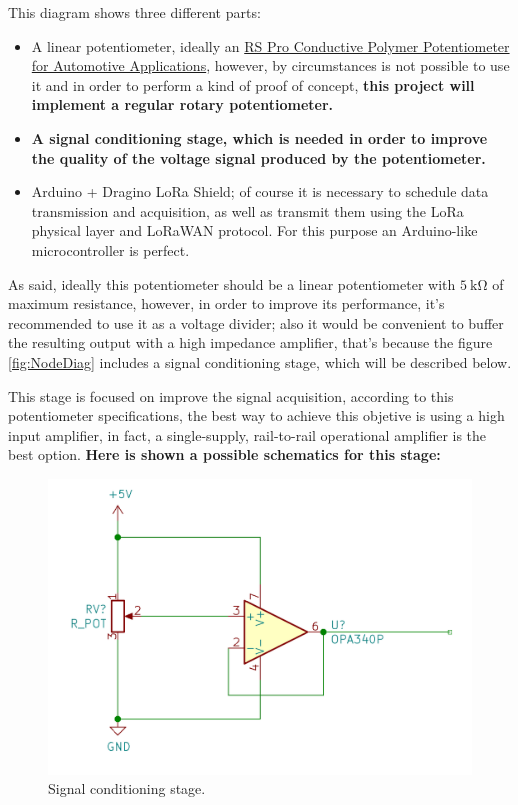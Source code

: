 \documentclass[11pt,a4paper,dvipsnames,twoside]{article}
\newcounter{subsubsubsection}[subsubsection]
\newcommand{\doubt}[1] {\textbf{\color{Red3}#1}}
\begin{document}
This diagram shows three different parts: 

\begin{itemize}
  \item A linear potentiometer, ideally an \href{https://docs.rs-online.com/37bf/0900766b814f0bd0.pdf}{RS Pro Conductive Polymer
  Potentiometer for Automotive Applications}, however, by circumstances is not possible to use it and in order to perform a kind of proof of concept, \doubt{this project will implement a regular rotary potentiometer.}
  \item \doubt{A signal conditioning stage, which is needed in order to improve the quality of the voltage signal produced by the potentiometer.}
  \item Arduino + Dragino LoRa Shield; of course it is necessary to schedule data transmission and acquisition, as well as transmit them using the LoRa physical layer and LoRaWAN protocol. For this purpose an Arduino-like microcontroller is perfect.  
\end{itemize}

As said, ideally this potentiometer should be a linear potentiometer with $5\ \si{\kilo\ohm}$ of maximum resistance, however, in order to improve its performance, it's recommended to use it as a voltage divider; also it would be convenient to buffer the resulting output with a high impedance amplifier, that's because the figure \ref{fig:NodeDiag} includes a signal conditioning stage, which will be described below.

This stage is focused on improve the signal acquisition, according to this potentiometer specifications, the best way to achieve this objetive is using a high input amplifier, in fact, a single-supply, rail-to-rail operational amplifier is the best option. \doubt{Here is shown a possible schematics for this stage:}

\begin{figure}[htp]
  \centering
    \includegraphics[width=.9\textwidth]{../schemes/Signal_Conditioning.png}
  \caption{Signal conditioning stage.}
  \label{fig:SignalCond}
\end{figure}
\end{document}
